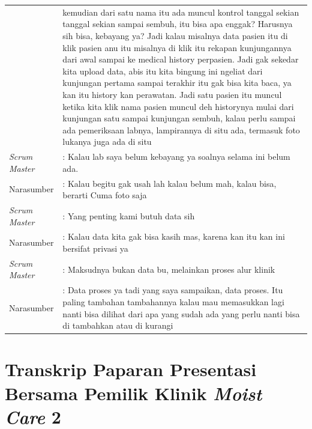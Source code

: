 \break
\begin{table}[ht!]
	\centerfirst
\begin{center}
		
\begin{tabular}{ p{2.8cm} p{11cm}}
& kemudian dari satu nama itu ada muncul kontrol tanggal sekian tanggal sekian sampai sembuh, itu bisa apa enggak? Harusnya sih bisa, kebayang ya? Jadi kalau misalnya data pasien itu di klik pasien anu itu misalnya di klik itu rekapan kunjungannya dari awal sampai ke medical history perpasien. Jadi gak sekedar kita upload data, abis itu kita bingung ini ngeliat dari kunjungan pertama sampai terakhir itu gak bisa kita baca, ya kan itu history kan perawatan. Jadi satu pasien itu muncul ketika kita klik nama pasien muncul deh historynya mulai dari kunjungan satu sampai kunjungan sembuh, kalau perlu sampai ada pemeriksaan labnya, lampirannya di situ ada, termasuk foto lukanya juga ada di situ\\

\emph{Scrum Master} & : Kalau lab saya belum kebayang ya soalnya selama ini belum ada.\\

Narasumber & : Kalau begitu gak usah lah kalau belum mah, kalau bisa, berarti Cuma foto saja\\

\emph{Scrum Master} & : Yang penting kami butuh data sih\\

Narasumber & : Kalau data kita gak bisa kasih mas, karena kan itu kan ini bersifat privasi ya\\

\emph{Scrum Master} & : Maksudnya bukan data bu, melainkan proses alur klinik\\

Narasumber & : Data proses ya tadi yang saya sampaikan, data proses. Itu paling tambahan tambahannya kalau mau memasukkan lagi nanti bisa dilihat dari apa yang sudah ada yang perlu nanti bisa di tambahkan atau di kurangi\\
\end{tabular}

\end{center}
\end{table}

\chapter{Transkrip Paparan Presentasi Bersama Pemilik Klinik \emph{Moist Care} 2}

